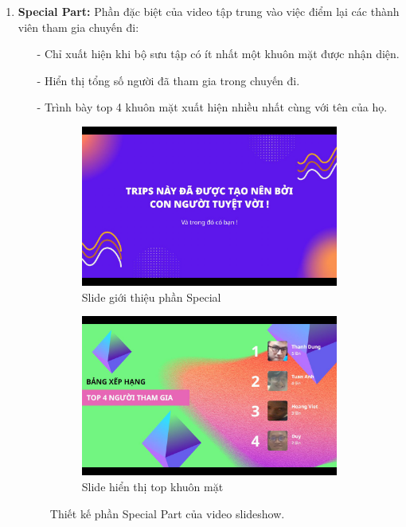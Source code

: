 \begin{enumerate}
    \item \textbf{Special Part:} Phần đặc biệt của video tập trung vào việc điểm lại các thành viên tham gia chuyến đi:
    \begin{itemize}
        \item[-] Chỉ xuất hiện khi bộ sưu tập có ít nhất một khuôn mặt được nhận diện.
        \item[-] Hiển thị tổng số người đã tham gia trong chuyến đi.
        \item[-] Trình bày top 4 khuôn mặt xuất hiện nhiều nhất cùng với tên của họ.
    \end{itemize}
    
    \begin{figure}[H]
        \centering
        \begin{subfigure}{0.48\textwidth}
            \includegraphics[width=1\linewidth]{figures/c4/4_1/special_1.jpg} 
            \caption{Slide giới thiệu phần Special}
        \end{subfigure}
        \hfill
        \begin{subfigure}{0.48\textwidth}
            \includegraphics[width=1\linewidth]{figures/c4/4_1/special_2.jpg} 
            \caption{Slide hiển thị top khuôn mặt}
        \end{subfigure}
        \caption{Thiết kế phần Special Part của video slideshow.}
        \label{fig:video-special-design}
    \end{figure}
    

\end{enumerate}
